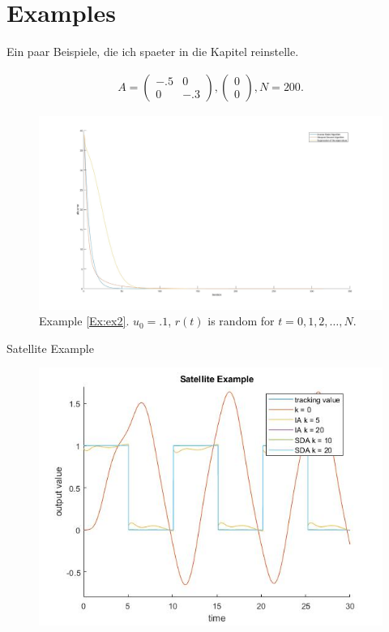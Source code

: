 \chapter{Examples}
Ein paar Beispiele, die ich spaeter in die Kapitel reinstelle. 

\begin{exam}
	\label{Ex:ex2}
	\begin{align}
	A = \begin{pmatrix}
	-.5 & 0 \\ 0 & -.3
	\end{pmatrix},
	\begin{pmatrix}   
	0 \\ 0
	\end{pmatrix}, N = 200. 
	\end{align}
	\begin{figure}[ht]
		\includegraphics[width=\textwidth]{fig/Ex2.jpg}
		\caption{Example \ref{Ex:ex2}. $u_0 = .1$, $r(t)$ is random for $t = 0, 1, 2, \dots, N$.}
	\end{figure}	
\end{exam}

\begin{exam}
	Satellite Example
	\begin{figure}[ht]
		\includegraphics[width=\textwidth]{fig/SatelliteEx.jpg}
		\caption{}
	\end{figure}	
\end{exam}

